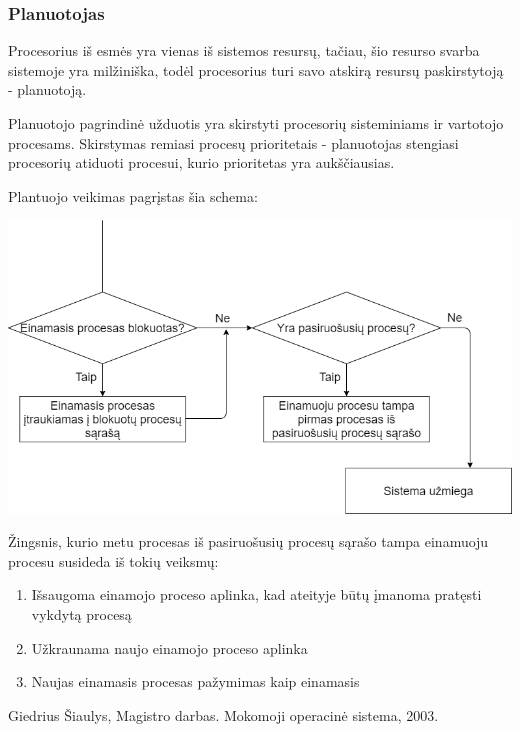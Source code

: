 \documentclass{scrartcl}
\begin{document}
        \subsubsection{Planuotojas}
        Procesorius iš esmės yra vienas iš sistemos resursų, tačiau, šio resurso svarba sistemoje yra milžiniška, todėl procesorius turi savo atskirą resursų paskirstytoją - planuotoją.
        \par
        Planuotojo pagrindinė užduotis yra skirstyti procesorių sisteminiams ir vartotojo procesams. Skirstymas remiasi procesų prioritetais - planuotojas stengiasi procesorių atiduoti procesui, kurio prioritetas yra aukščiausias.
        \par
        Plantuojo veikimas pagrįstas šia schema:
        \begin{center}
          \includegraphics[width=\textwidth]{Planner}
        \end{center}
        Žingsnis, kurio metu procesas iš pasiruošusių procesų sąrašo tampa einamuoju procesu susideda iš tokių veiksmų:
        \begin{enumerate}
          \item Išsaugoma einamojo proceso aplinka, kad ateityje būtų įmanoma pratęsti vykdytą procesą
          \item Užkraunama naujo einamojo proceso aplinka
          \item Naujas einamasis procesas pažymimas kaip einamasis
        \end{enumerate}
        \begin{thebibliography}{999}
            \bibitem{}
                Giedrius Šiaulys,
                Magistro darbas. Mokomoji operacinė sistema,
                2003.
        \end{thebibliography}
    
\end{document}
